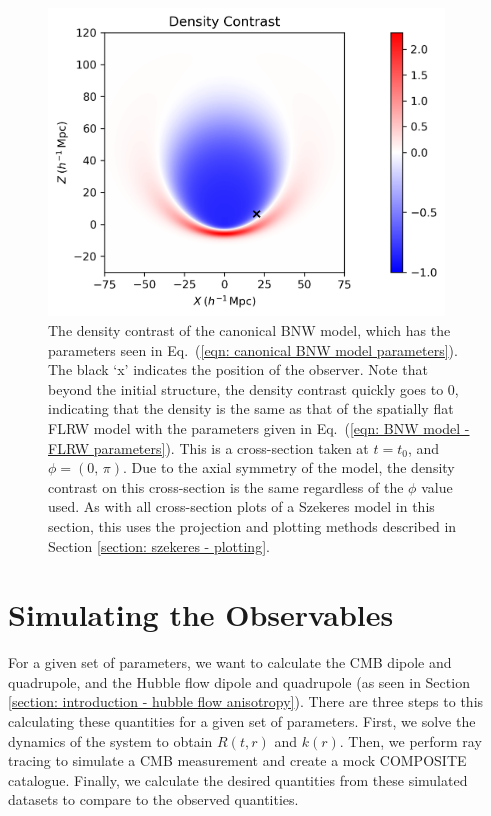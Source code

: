 \documentclass[a4paper,12pt]{report}
\renewcommand{\eqref}[1]{Eq.~({#1})}
\begin{document}
\begin{figure}[htb]
  \centering
  \includegraphics[width=105mm]{BNW params density contrast}
  \caption{The density contrast of the canonical BNW model, which has the parameters seen in \eqref{\ref{eqn: canonical BNW model parameters}}. The black `x' indicates the position of the observer. Note that beyond the initial structure, the density contrast quickly goes to 0, indicating that the density is the same as that of the spatially flat FLRW model with the parameters given in \eqref{\ref{eqn: BNW model - FLRW parameters}}. This is a cross-section taken at $t=t_0$, and $\phi=(0,\,\pi)$. Due to the axial symmetry of the model, the density contrast on this cross-section is the same regardless of the $\phi$ value used. As with all cross-section plots of a Szekeres model in this section, this uses the projection and plotting methods described in Section \ref{section: szekeres - plotting}.}
  \label{fig: BNW params density contrast}
\end{figure}


\section{Simulating the Observables}
For a given set of parameters, we want to calculate the CMB dipole and quadrupole, and the Hubble flow dipole and quadrupole (as seen in Section \ref{section: introduction - hubble flow anisotropy}). There are three steps to this calculating these quantities for a given set of parameters. First, we solve the dynamics of the system to obtain $R(t,r)$ and $k(r)$. Then, we perform ray tracing to simulate a CMB measurement and create a mock COMPOSITE catalogue. Finally, we calculate the desired quantities from these simulated datasets to compare to the observed quantities.
\end{document}
